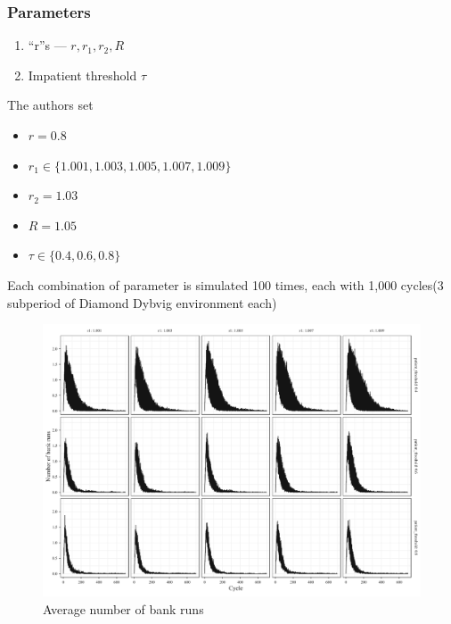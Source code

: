 \begin{frame}
    \frametitle{Parameters}

    \begin{enumerate}
        \item ``r''s --- $r, r_1, r_2, R$
        \item Impatient threshold $\tau$
    \end{enumerate}

    \vfill 
    \pause
    The authors set 
    \begin{itemize}
        \item $r = 0.8$
        \item $r_1 \in \{1.001, 1.003, 1.005, 1.007, 1.009\}$
        \item $r_2 = 1.03$
        \item $R = 1.05$
        \item $\tau \in \{0.4, 0.6, 0.8\}$
    \end{itemize}
    \vfill
    Each combination of parameter is simulated 100 times, each with 1,000 cycles(3 subperiod of Diamond Dybvig environment each)
    
\end{frame}

\begin{frame}[plain]
    \setcounter{figure}{2}
    \begin{figure}
        \centering
        \includegraphics[width=\textwidth]{fig/fig3.jpeg}
        \caption{Average number of bank runs}
        \label{fig:num_run}
    \end{figure}
\end{frame}

